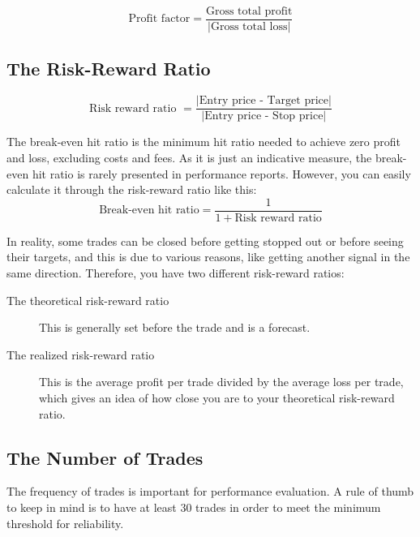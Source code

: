 \begin{equation}
    \text{Profit factor}=\frac{\text{Gross total profit}}{|\text{Gross total loss}|}
\end{equation}
\subsection{The Risk-Reward Ratio}
\begin{equation}
    \text{Risk reward ratio }=\frac{|\text{Entry price - Target price}|}{|\text{Entry price - Stop price}|}
\end{equation}

The break-even hit ratio is the minimum hit ratio needed to achieve zero profit and loss, excluding costs and fees. As it is just an indicative measure, the break-even hit ratio is rarely presented in performance reports. However, you can easily calculate it through the risk-reward ratio like this:
\begin{equation}
    \text{Break-even hit ratio} =\frac{1}{1 + \text{Risk reward ratio}}
\end{equation}

In reality, some trades can be closed before getting stopped out or before seeing their targets, and this is due to various reasons, like getting another signal in the same direction. Therefore, you have two different risk-reward ratios:
\begin{description}
    \item[The theoretical risk-reward ratio] This is generally set before the trade and is a forecast.
    \item[The realized risk-reward ratio] This is the average profit per trade divided by the average loss per trade, which gives an idea of how close you are to your theoretical risk-reward ratio.
\end{description}
\subsection{The Number of Trades}
The frequency of trades is important for performance evaluation. A rule of thumb to keep in mind is to have at least 30 trades in order to meet the minimum threshold for reliability.